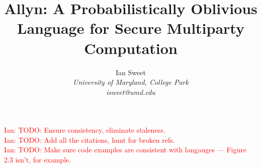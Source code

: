 \documentclass{report}
\newcommand{\lang}{Allyn\xspace}
\newcommand{\ins}[1]{\textcolor{red}{Ian: #1}}
\begin{document}
\title{\lang: A Probabilistically Oblivious Language for Secure Multiparty Computation}

\author{Ian Sweet \\
  \emph{University of Maryland, College Park} \\
  \emph{isweet@umd.edu}}

\date{}

\maketitle

\begin{abstract}  \end{abstract}

\ins{TODO: Ensure consistency, eliminate staleness.} \\
\ins{TODO: Add all the citations, hunt for broken refs.} \\
\ins{TODO: Make sure code examples are consistent with langauges --- Figure 2.3 isn't, for example.}

\tableofcontents








\appendix



\end{document}
